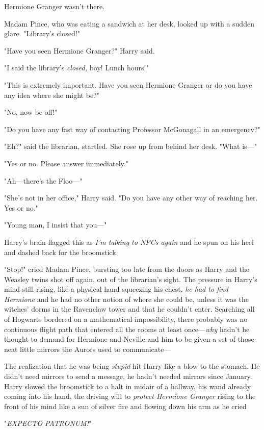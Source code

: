 Hermione Granger wasn't there.

Madam Pince, who was eating a sandwich at her desk, looked up with a sudden 
glare. "Library's closed!"

"Have you seen Hermione Granger?" Harry said.

"I said the library's \emph{closed,} boy! Lunch hours!"

"This is extremely important. Have you seen Hermione Granger or do you have any 
idea where she might be?"

"No, now be off!"

"Do you have any fast way of contacting Professor McGonagall in an emergency?"

"Eh?" said the librarian, startled. She rose up from behind her desk. "What 
is---"

"Yes or no. Please answer immediately."

"Ah---there's the Floo---"

"She's not in her office," Harry said. "Do you have any other way of reaching 
her. Yes or no."

"Young man, I insist that you---"

Harry's brain flagged this as \emph{I'm talking to NPCs again} and he spun on 
his heel and dashed back for the broomstick.

"Stop!" cried Madam Pince, bursting too late from the doors as Harry and the 
Weasley twins shot off again, out of the librarian's sight. The pressure in 
Harry's mind still rising, like a physical hand squeezing his chest, \emph{he 
had to find Hermione} and he had no other notion of where she could be, unless 
it was the witches' dorms in the Ravenclaw tower and that he couldn't enter. 
Searching all of Hogwarts bordered on a mathematical impossibility, there 
probably was no continuous flight path that entered all the rooms at least 
once---\emph{why} hadn't he thought to demand for Hermione and Neville and him 
to be given a set of those neat little mirrors the Aurors used to communicate---

The realization that he was being \emph{stupid} hit Harry like a blow to the 
stomach. He didn't need mirrors to send a message, he hadn't needed mirrors 
since January. Harry slowed the broomstick to a halt in midair of a hallway, 
his wand already coming into his hand, the driving will to \emph{protect 
Hermione Granger} rising to the front of his mind like a sun of silver fire and 
flowing down his arm as he cried

"\emph{EXPECTO PATRONUM!}"


